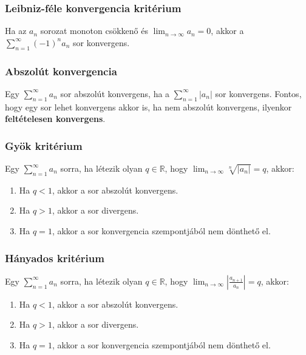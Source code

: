 \documentclass{article}
\begin{document}
\subsubsection{Leibniz-féle konvergencia kritérium}

Ha az $a_n$ sorozat monoton csökkenő és $\lim_{n \to \infty} a_n = 0$, akkor a $\sum_{n=1}^\infty (-1)^n a_n$ sor konvergens.

\subsubsection{Abszolút konvergencia}

Egy $\sum_{n=1}^{\infty} a_n$ sor abszolút konvergens, ha a $\sum_{n=1}^{\infty} \left\lvert a_n \right\rvert$ sor konvergens. Fontos, hogy egy sor lehet konvergens akkor is, ha nem abszolút konvergens, ilyenkor \textbf{feltételesen konvergens}.

\subsubsection{Gyök kritérium}

Egy $\sum_{n=1}^{\infty} a_n$ sorra, ha létezik olyan $q \in \mathbb{R}$, hogy $\lim_{n \to \infty} \sqrt[n]{\left\lvert a_n \right\rvert} = q$, akkor:

\begin{enumerate}
    \item Ha $q < 1$, akkor a sor abszolút konvergens.
    \item Ha $q > 1$, akkor a sor divergens.
    \item Ha $q = 1$, akkor a sor konvergencia szempontjából nem dönthető el.
\end{enumerate}

\subsubsection{Hányados kritérium}

Egy $\sum_{n=1}^{\infty} a_n$ sorra, ha létezik olyan $q \in \mathbb{R}$, hogy $\lim_{n \to \infty} \left\lvert \frac{a_{n+1}}{a_n} \right\rvert = q$, akkor:

\begin{enumerate}
    \item Ha $q < 1$, akkor a sor abszolút konvergens.
    \item Ha $q > 1$, akkor a sor divergens.
    \item Ha $q = 1$, akkor a sor konvergencia szempontjából nem dönthető el.
\end{enumerate}
\end{document}
